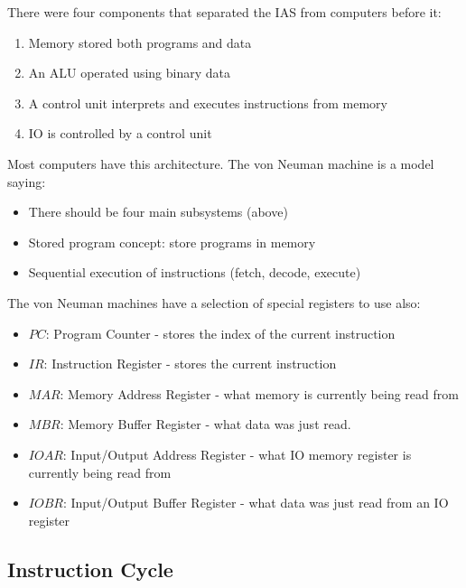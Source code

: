 There were four components that separated the IAS from computers before it:
\begin{enumerate}
    \item Memory stored both programs and data
    \item An ALU operated using binary data
    \item A control unit interprets and executes instructions from memory
    \item IO is controlled by a control unit
\end{enumerate}
%
Most computers have this architecture.
The von Neuman machine is a model saying:
\begin{itemize}
    \item There should be four main subsystems (above)
    \item Stored program concept: store programs in memory
    \item Sequential execution of instructions (fetch, decode, execute)
\end{itemize}
%
The von Neuman machines have a selection of special registers to use also:
\begin{itemize}
    \item \(PC\): Program Counter - stores the index of the current instruction
    \item \(IR\): Instruction Register - stores the current instruction
    \item \(MAR\): Memory Address Register - what memory is currently being read from
    \item \(MBR\): Memory Buffer Register - what data was just read.
    \item \(IO AR\): Input/Output Address Register - what IO memory register is currently being read from
    \item \(IO BR\): Input/Output Buffer Register - what data was just read from an IO register
\end{itemize}

\subsection{Instruction Cycle}\label{sub:instruction_cycle}

